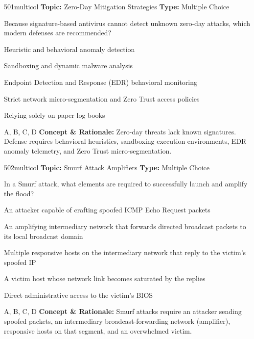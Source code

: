 \begin{qcard}{501}{multicol}
\textcolor{darkslate!75}{\small\textbf{Topic:} Zero-Day Mitigation Strategies \hfill \textbf{Type:} Multiple Choice}\vspace{0.4em}\par
Because signature-based antivirus cannot detect unknown zero-day attacks, which modern defenses are recommended?
\begin{qoptions}
\item Heuristic and behavioral anomaly detection
\item Sandboxing and dynamic malware analysis
\item Endpoint Detection and Response (EDR) behavioral monitoring
\item Strict network micro-segmentation and Zero Trust access policies
\item Relying solely on paper log books
\end{qoptions}
\end{qcard}
\nopagebreak
\begin{explainbox}{A, B, C, D}
\textbf{Concept \& Rationale:} Zero-day threats lack known signatures. Defense requires behavioral heuristics, sandboxing execution environments, EDR anomaly telemetry, and Zero Trust micro-segmentation.
\end{explainbox}

\begin{qcard}{502}{multicol}
\textcolor{darkslate!75}{\small\textbf{Topic:} Smurf Attack Amplifiers \hfill \textbf{Type:} Multiple Choice}\vspace{0.4em}\par
In a Smurf attack, what elements are required to successfully launch and amplify the flood?
\begin{qoptions}
\item An attacker capable of crafting spoofed ICMP Echo Request packets
\item An amplifying intermediary network that forwards directed broadcast packets to its local broadcast domain
\item Multiple responsive hosts on the intermediary network that reply to the victim's spoofed IP
\item A victim host whose network link becomes saturated by the replies
\item Direct administrative access to the victim's BIOS
\end{qoptions}
\end{qcard}
\nopagebreak
\begin{explainbox}{A, B, C, D}
\textbf{Concept \& Rationale:} Smurf attacks require an attacker sending spoofed packets, an intermediary broadcast-forwarding network (amplifier), responsive hosts on that segment, and an overwhelmed victim.
\end{explainbox}

